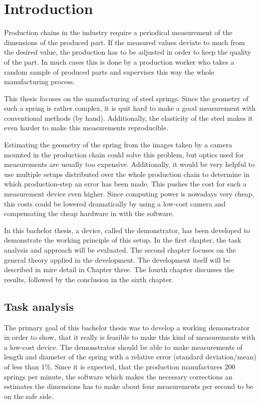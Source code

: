 \chapter{Introduction}
Production chains in the industry require a periodical measurement of the dimensions of the produced part.
If the measured values deviate to much from the desired value, the production has to be adjusted in order to keep the quality of the part.
In much cases this is done by a production worker who takes a random sample of produced parts and supervises this way the whole manufacturing process.

This thesis focuses on the manufacturing of steel springs.
Since the geometry of such a spring is rather complex, it is quit hard to make a good measurement with conventional methods (by hand).
Additionally, the elasticity of the steel makes it even harder to make this measurements reproducible.

Estimating the geometry of the spring from the images taken by a camera mounted in the production chain could solve this problem, but optics used for measurements are usually too expensive.
Additionally, it would be very helpful to use multiple setups distributed over the whole production chain to determine in which production-step an error has been made.
This pushes the cost for such a measurement device even higher.
Since computing power is nowadays very cheap, this costs could be lowered dramatically by using a low-cost camera and compensating the cheap hardware in with the software.

In this bachelor thesis, a device, called the demonstrator, has been developed to demonstrate the working principle of this setup.
In the first chapter, the task analysis and approach will be evaluated.
The second chapter focuses on the general theory applied in the development.
The development itself will be described in mire detail in Chapter three.
The fourth chapter discusses the results, followed by the conclusion in the sixth chapter. 

\section{Task analysis}
The primary goal of this bachelor thesis was to develop a working demonstrator in order to show, that it really is feasible to make this kind of measurements with a low-cost device.
The demonstrator should be able to make measurements of length and diameter of the spring with a relative error (standard deviation/mean) of less than 1\%.
Since it is expected, that the production manufactures 200 springs per minute, the software which makes the necessary corrections an estimates the dimensions has to make about four measurements per second to be on the safe side.

